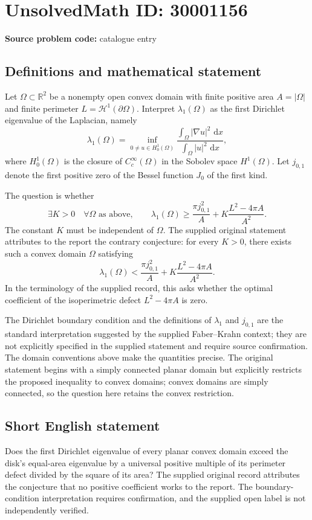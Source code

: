 \documentclass[11pt]{article}
\newcommand{\R}{\mathbb{R}}
\newcommand{\dd}{\,\mathrm{d}}
\begin{document}
\section*{UnsolvedMath ID: 30001156}
\textbf{Source problem code:} catalogue entry
\subsection{Definitions and mathematical statement}
Let \(\Omega\subset\R^2\) be a nonempty open convex domain with finite positive area \(A=|\Omega|\) and finite perimeter \(L=\mathcal H^1(\partial\Omega)\). Interpret \(\lambda_1(\Omega)\) as the first Dirichlet eigenvalue of the Laplacian, namely
\[
\lambda_1(\Omega)=\inf_{0\ne u\in H_0^1(\Omega)}\frac{\int_\Omega |\nabla u|^2\,\dd x}{\int_\Omega |u|^2\,\dd x},
\]
where \(H_0^1(\Omega)\) is the closure of \(C_c^\infty(\Omega)\) in the Sobolev space \(H^1(\Omega)\). Let \(j_{0,1}\) denote the first positive zero of the Bessel function \(J_0\) of the first kind.

The question is whether
\[
\exists K>0\quad\forall\Omega\text{ as above},\qquad
\lambda_1(\Omega)\geq\frac{\pi j_{0,1}^2}{A}+K\frac{L^2-4\pi A}{A^2}.
\]
The constant \(K\) must be independent of \(\Omega\). The supplied original statement attributes to the report the contrary conjecture: for every \(K>0\), there exists such a convex domain \(\Omega\) satisfying
\[
\lambda_1(\Omega)<\frac{\pi j_{0,1}^2}{A}+K\frac{L^2-4\pi A}{A^2}.
\]
In the terminology of the supplied record, this asks whether the optimal coefficient of the isoperimetric defect \(L^2-4\pi A\) is zero.

The Dirichlet boundary condition and the definitions of \(\lambda_1\) and \(j_{0,1}\) are the standard interpretation suggested by the supplied Faber--Krahn context; they are not explicitly specified in the supplied statement and require source confirmation. The domain conventions above make the quantities precise. The original statement begins with a simply connected planar domain but explicitly restricts the proposed inequality to convex domains; convex domains are simply connected, so the question here retains the convex restriction.
\subsection{Short English statement}
Does the first Dirichlet eigenvalue of every planar convex domain exceed the disk's equal-area eigenvalue by a universal positive multiple of its perimeter defect divided by the square of its area? The supplied original record attributes the conjecture that no positive coefficient works to the report. The boundary-condition interpretation requires confirmation, and the supplied open label is not independently verified.
\end{document}
